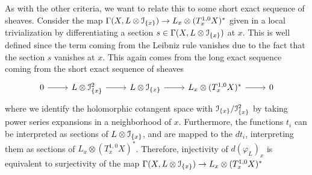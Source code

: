 As with the other criteria, we want to relate this to some short exact sequence of
sheaves. Consider the map
$\Gamma(X, L\otimes \mathcal{I}_{\left\lbrace x \right\rbrace}) \to L_x \otimes (T^{1,0}_xX)^*$
given in a local trivialization by differentiating a section
$s \in \Gamma(X, L\otimes \mathcal{I}_{\left\lbrace x \right\rbrace})$ at $x$.
This is well defined since the term coming from the Leibniz rule vanishes
due to the fact that the section $s$ vanishes at $x$. This
again comes from the long exact sequence coming from the short
exact sequence of sheaves
\[\begin{tikzcd}
0 \ar[r] & L \otimes \mathcal{I}^2_{\set{x}} \ar[r] & L \otimes \mathcal{I}_{\set{x}}
\ar[r] & L_x \otimes (T^{1,0}_xX)^* \ar[r] & 0
\end{tikzcd}\]
where we identify the holomorphic cotangent space with
$\mathcal{I}_{\left\lbrace x \right\rbrace}/\mathcal{I}_{\left\lbrace x \right\rbrace}^2$ by taking power series expansions in a
neighborhood of $x$. Furthermore, the functions $t_i$ can be interpreted
as sections of $L \otimes \mathcal{I}_{\left\lbrace x \right\rbrace}$, and are mapped to
the $dt_i$, interpreting them as sections of $L_x \otimes (T^{1,0}_xX)^*$.
Therefore, injectivity of $d(\varphi_L)_x$ is equivalent to surjectivity of
the map $\Gamma(X, L\otimes \mathcal{I}_{\left\lbrace x \right\rbrace}) \to L_x \otimes (T^{1,0}_xX)^*$ \\

